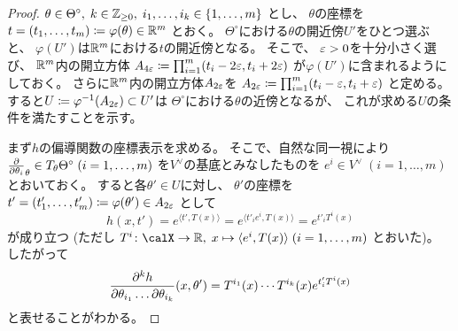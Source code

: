 \documentclass[report]{jlreq}
\begin{document}
\begin{proof}
    $\theta \in \Theta^\circ, \;
        k \in \mathbb{Z}_{\ge 0}, \;
        i_1, \dots, i_k \in \{ 1, \dots, m \}$
    とし、
    $\theta$の座標を
    $t = (t_1, \dots, t_m) \coloneqq \varphi(\theta) \in \mathbb{R}^m$
    とおく。
    $\Theta^\circ$における$\theta$の開近傍$U'$をひとつ選ぶと、
    $\varphi(U')$は$\mathbb{R}^m$における$t$の開近傍となる。
    そこで、
    $\varepsilon > 0$を十分小さく選び、
    $\mathbb{R}^m$内の開立方体
    $A_{4\varepsilon}
        \coloneqq
        \prod_{i = 1}^m (t_i - 2\varepsilon, t_i + 2\varepsilon)$
    が$\varphi(U')$に含まれるようにしておく。
    さらに$\mathbb{R}^m$内の開立方体$A_{2\varepsilon}$を
    $A_{2\varepsilon}
        \coloneqq
        \prod_{i = 1}^m (t_i - \varepsilon, t_i + \varepsilon)$
    と定める。
    すると$U \coloneqq \varphi^{-1}(A_{2\varepsilon}) \subset U'$は
    $\Theta^\circ$における$\theta$の近傍となるが、
    これが求める$U$の条件を満たすことを示す。

    まず$h$の偏導関数の座標表示を求める。
    そこで、自然な同一視により
    $\deldel{\theta_i}_\theta \in T_\theta \Theta^\circ \;
        (i = 1, \dots, m)$
    を$V^\vee$の基底とみなしたものを
    $e^i \in V^\vee \; (i = 1, \dots, m)$
    とおいておく。
    すると各$\theta' \in U$に対し、
    $\theta'$の座標を
    $t' = (t'_1, \dots, t'_m) \coloneqq \varphi(\theta') \in A_{2\varepsilon}$
    として
    \begin{equation}
        h(x, t')
            = e^{\langle t', T(x) \rangle}
            = e^{\langle t'_i e^i, T(x) \rangle}
            = e^{t'_i T^i(x)}
    \end{equation}
    が成り立つ
    (ただし
        $T^i \colon \calX \to \R, \;
        x \mapsto \langle e^i, T(x) \rangle \;
        (i = 1, \dots, m)$
        とおいた)。
    したがって
    \begin{equation}
        \locallabel{eq:partial-derivative-of-h}
        \frac{\del^k h}{\del \theta_{i_1} \dots \del \theta_{i_k}}(x, \theta')
            = T^{i_1}(x) \cdots T^{i_k}(x) e^{t'_i T^i(x)}
    \end{equation}
    と表せることがわかる。


\end{proof}
\end{document}
